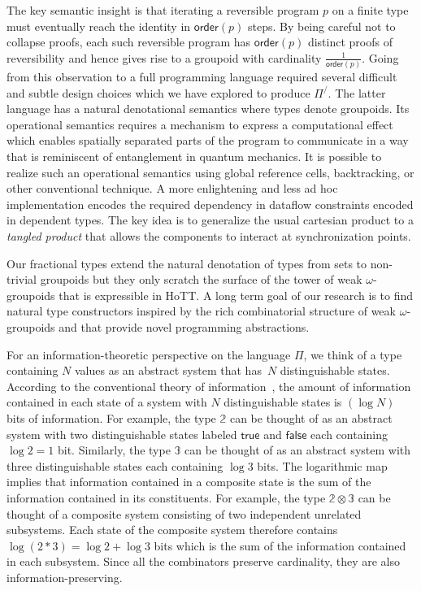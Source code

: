 \documentclass[a4paper,USenglish]{lipics-v2016-utf8x}
\newcommand{\ord}[1]{\ensuremath{\mathsf{order}(#1)}}
\begin{document}
The key semantic insight is that iterating a reversible program $p$ on
a finite type must eventually reach the identity in $\ord{p}$
steps. By being careful not to collapse proofs, each such reversible
program has $\ord{p}$ distinct proofs of reversibility and hence gives
rise to a groupoid with cardinality $\frac{1}{\ord{p}}$. Going from
this observation to a full programming language required several
difficult and subtle design choices which we have explored to produce
$\Pi^/$. The latter language has a natural denotational semantics
where types denote groupoids. Its operational semantics requires a
mechanism to express a computational effect which enables spatially
separated parts of the program to communicate in a way that is
reminiscent of entanglement in quantum mechanics. It is possible to
realize such an operational semantics using global reference cells,
backtracking, or other conventional technique. A more enlightening and
less ad hoc implementation encodes the required dependency in dataflow
constraints encoded in dependent types. The key idea is to generalize
the usual cartesian product to a \emph{tangled product} that allows the
components to interact at synchronization points.

Our fractional types extend the natural denotation of types from sets
to non-trivial groupoids but they only scratch the surface of the
tower of weak $\omega$-groupoids that is expressible in HoTT. A long
term goal of our research is to find natural type constructors
inspired by the rich combinatorial structure of weak
$\omega$-groupoids and that provide novel programming abstractions.

For an information-theoretic perspective on the language $\Pi$, we think of a
type containing $N$ values as an abstract system that has~$N$ distinguishable
states. According to the conventional theory of information~\cite{Shannon1948},
the amount of information contained in each state of a system with $N$
distinguishable states is $(\log N)$ bits of information. For example, the type
$\mathbb{2}$ can be thought of as an abstract system with two distinguishable
states labeled $\mathsf{true}$ and $\mathsf{false}$ each containing $\log 2 = 1$
bit. Similarly, the type $\mathbb{3}$ can be thought of as an abstract system
with three distinguishable states each containing $\log 3$ bits. The logarithmic
map implies that information contained in a composite state is the sum of the
information contained in its constituents. For example, the type $\mathbb{2}
\otimes \mathbb{3}$ can be thought of a composite system consisting of two
independent unrelated subsystems. Each state of the composite system therefore
contains $\log (2 * 3) = \log 2 + \log 3$ bits which is the sum of the
information contained in each subsystem. Since all the combinators preserve
cardinality, they are also information-preserving.



\end{document}
